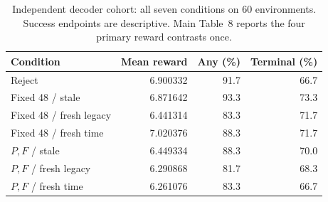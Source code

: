 \documentclass[10pt,a4paper]{article}
\begin{document}
\renewcommand{\thetable}{S\arabic{table}}
\setcounter{table}{17}
\begin{table}[H]\centering\small
\caption{Independent decoder cohort: all seven conditions on 60 environments. Success endpoints are descriptive. Main Table~8 reports the four primary reward contrasts once.}
\begin{tabular}{lrrr}\toprule Condition & Mean reward & Any (\%) & Terminal (\%)\\\midrule
Reject & 6.900332 & 91.7 & 66.7\\
Fixed 48 / stale & 6.871642 & 93.3 & 73.3\\
Fixed 48 / fresh legacy & 6.441314 & 83.3 & 71.7\\
Fixed 48 / fresh time & 7.020376 & 88.3 & 71.7\\
$P,F$ / stale & 6.449334 & 88.3 & 70.0\\
$P,F$ / fresh legacy & 6.290868 & 81.7 & 68.3\\
$P,F$ / fresh time & 6.261076 & 83.3 & 66.7\\
\bottomrule\end{tabular}\end{table}
\end{document}
